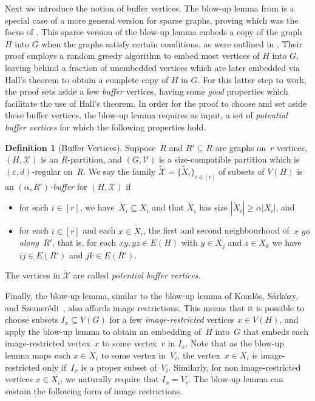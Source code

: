 \documentclass[final]{article}
\theoremstyle{definition}
\newtheorem{definition}[theorem]{Definition}
\newcommand{\eps}{\varepsilon}
\let\tilde\widetilde
\begin{document}
Next we introduce the notion of buffer vertices. The blow-up lemma from \cite{sparse_blowup} is a special case of a more general version for sparse graphs, proving which was the focus of \cite{sparse_blowup}. This sparse version of the blow-up lemma embeds a copy of the graph~$H$ into $G$ when the graphs satisfy certain conditions, as were outlined in \cite{sparse_blowup}. Their proof employs a random greedy algorithm to embed most vertices of $H$ into $G$, leaving behind a fraction of unembedded vertices which are later embedded via Hall's theorem to obtain a complete copy of $H$ in $G$. For this latter step to work, the proof sets aside a few \emph{buffer} vertices, having some \emph{good} properties which facilitate the use of Hall's theorem. In order for the proof to choose and set aside these buffer vertices, the blow-up lemma requires as input, a set of \emph{potential buffer vertices} for which the following properties hold.  

\begin{definition}[Buffer Vertices]
\label{defn:buffer}
  Suppose~$R$ and $R'\subseteq R$ are graphs on~$r$ vertices, $(H,\mathcal{X})$ is an
  $R$-partition, and $(G,\mathcal{V})$ is a size-compatible partition which is $(\eps,d)$-regular on~$R$.
  We say the family $\tilde{\mathcal{X}}=\{\tilde{X}_i\}_{i\in[r]}$ of subsets of $V(H)$ is
  an \emph{$(\alpha,R')$-buffer} for $(H,\mathcal{X})$ if
 \begin{itemize}
 \item for each $i\in[r]$, we have~$\tilde{X}_i\subseteq X_i$ and that $\tilde{X}_i$ has size $|\tilde{X}_i|\ge\alpha |X_i|$, and 
 \item for each $i\in[r]$ and each $x\in\tilde{X}_i$, the first and second
   neighbourhood of~$x$ \emph{go along~$R'$}, that is,
   for each $xy, yz\in E(H)$ with $y\in X_j$ and $z\in X_k$ we have $ij\in E(R')$ and $jk\in E(R')$.
 \end{itemize}
 The vertices in $\tilde{\mathcal{X}}$ are called \emph{potential buffer vertices}. 
\end{definition}

Finally, the blow-up lemma, similar to the blow-up lemma of Koml\'os, S\'ark\"ozy, and Szemer\'edi~\cite{Blowup_lemma}, also affords image restrictions. This means that it is possible to choose subsets $I_x \subseteq V(G)$ for a few \emph{image-restricted} vertices $x \in V(H)$, and apply the blow-up lemma to obtain an embedding of~$H$ into~$G$ that embeds each image-restricted vertex~$x$ to some vertex~$v$ in $I_x$. Note that as the blow-up lemma maps each $x\in X_i$ to some vertex in~$V_i$, the vertex~$x \in X_i$ is image-restricted only if~$I_x$ is a proper subset of~$V_i$. Similarly, for non image-restricted vertices $x \in X_i$, we naturally require that $I_x = V_i$. The blow-up lemma can sustain the following form of image restrictions.   
\end{document}
